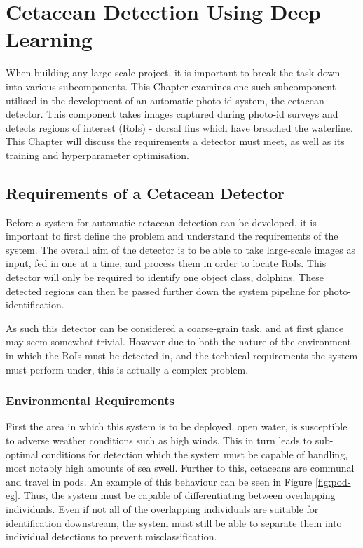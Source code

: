 \chapter{Cetacean Detection Using Deep Learning}\label{ch:cetDet}

When building any large-scale project, it is important to break the task down into various subcomponents. This Chapter examines one such subcomponent utilised in the development of an automatic photo-id system, the cetacean detector. This component takes images captured during photo-id surveys and detects regions of interest (RoIs) - dorsal fins which have breached the waterline. This Chapter will discuss the requirements a detector must meet, as well as its training and hyperparameter optimisation. 

\section{Requirements of a Cetacean Detector}\label{ch:cetDet,sec:requirements}

Before a system for automatic cetacean detection can be developed, it is important to first define the problem and understand the requirements of the system. The overall aim of the detector is to be able to take large-scale images as input, fed in one at a time, and process them in order to locate RoIs. This detector will only be required to identify one object class, dolphins. These detected regions can then be passed further down the system pipeline for photo-identification. 

 As such this detector can be considered a coarse-grain task, and at first glance may seem somewhat trivial. However due to both the nature of the environment in which the RoIs must be detected in, and the technical requirements the system must perform under, this is actually a complex problem. 
 
 \subsection{Environmental Requirements}\label{ch:cetDet,sec:requirements,sub:environmental}
 
 First the area in which this system is to be deployed, open water, is susceptible to adverse weather conditions such as high winds. This in turn leads to sub-optimal conditions for detection which the system must be capable of handling, most notably high amounts of sea swell. Further to this, cetaceans are communal and travel in pods. An example of this behaviour can be seen in Figure \ref{fig:pod-eg}. Thus, the system must be capable of differentiating between overlapping individuals. Even if not all of the overlapping individuals are suitable for identification downstream, the system must still be able to separate them into individual detections to prevent misclassification.
 

